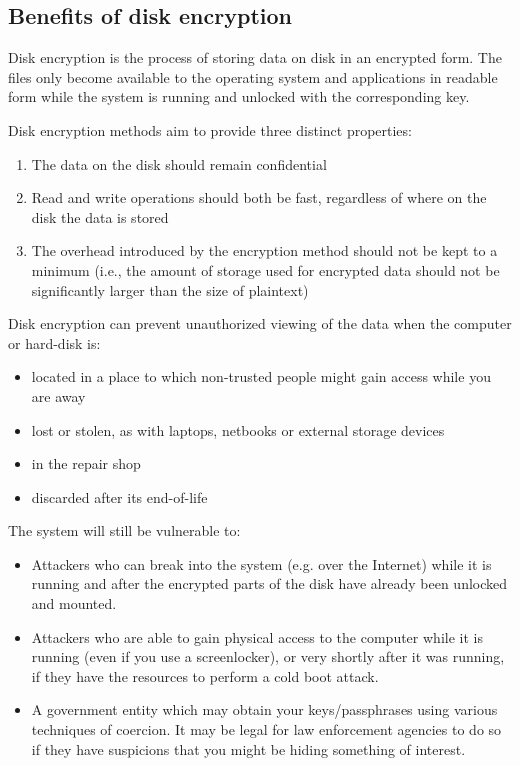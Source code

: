 \subsection{Benefits of disk encryption}
\label{sub-sec:benefits-enc}

Disk encryption is the process of storing data on disk in an encrypted form. The files only become available to the operating system and applications in readable form while the system is running and unlocked with the corresponding key.

Disk encryption methods aim to provide three distinct properties:
\begin{enumerate}
\item The data on the disk should remain confidential
\item Read and write operations should both be fast, regardless of where on the disk the data is stored
\item The overhead introduced by the encryption method should not be kept to a minimum (i.e., the amount of storage used for encrypted data should not be significantly larger than the size of plaintext)
\end{enumerate}

Disk encryption can prevent unauthorized viewing of the data when the computer or hard-disk is:
\begin{itemize}
\item located in a place to which non-trusted people might gain access while you are away
\item lost or stolen, as with laptops, netbooks or external storage devices
\item in the repair shop
\item discarded after its end-of-life
\end{itemize}

The system will still be vulnerable to:
\begin{itemize}
\item Attackers who can break into the system (e.g. over the Internet) while it is running and after the encrypted parts of the disk have already been unlocked and mounted.
\item Attackers who are able to gain physical access to the computer while it is running (even if you use a screenlocker), or very shortly after it was running, if they have the resources to perform a cold boot attack.
\item A government entity which may obtain your keys/passphrases using various techniques of coercion. It may be legal for law enforcement agencies to do so if they have suspicions that you might be hiding something of interest.
\end{itemize}
\cite{disk-enc}

